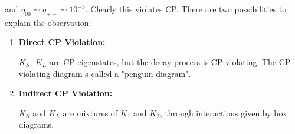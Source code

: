 and $\eta_{00} \sim \eta_{+-} \sim 10^{-3}$. Clearly this violates CP. There are two possibilities to explain the observation:
\begin{enumerate}
\item \textbf{Direct CP Violation: }

$K_S,\ K_L$ are CP eigenstates, but the decay process is CP violating. The CP violating diagram s called a "penguin diagram".
\begin{figure}[H]
  \hfill
  \end{figure}
\item \textbf{Indirect CP Violation: }

$K_S$ and $K_L$ are mixtures of $K_1$ and $K_2$, through interactions given by box diagrams. 
\begin{figure}[H] 
  \hfill
  \end{figure}
\end{enumerate}
